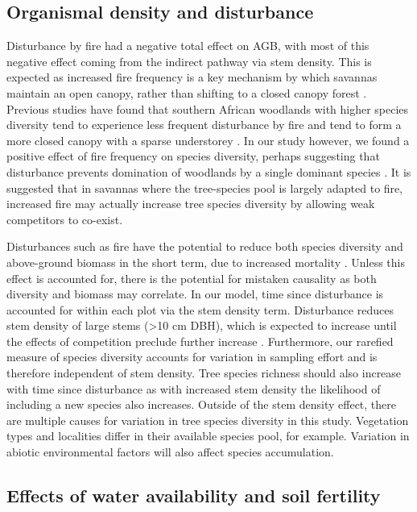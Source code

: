 \begin{refsection}
\subsection{Organismal density and disturbance}
\label{befr:ssec:disturbance}

Disturbance by fire had a negative total effect on AGB, with most of this negative effect coming from the indirect pathway via stem density. This is expected as increased fire frequency is a key mechanism by which savannas maintain an open canopy, rather than shifting to a closed canopy forest \citep{Staver2011}. Previous studies have found that southern African woodlands with higher species diversity tend to experience less frequent disturbance by fire and tend to form a more closed canopy with a sparse understorey \citep{Chidumayo2013, Mutowo2012}. In our study however, we found a positive effect of fire frequency on species diversity, perhaps suggesting that disturbance prevents domination of woodlands by a single dominant species \citep{Chidumayo2013, Durigan2020, Staver2009}. It is suggested that in savannas where the tree-species pool is largely adapted to fire, increased fire may actually increase tree species diversity by allowing weak competitors to co-exist. 

Disturbances such as fire have the potential to reduce both species diversity and above-ground biomass in the short term, due to increased mortality \citep{Huston2014}. Unless this effect is accounted for, there is the potential for mistaken causality as both diversity and biomass may correlate. In our model, time since disturbance is accounted for within each plot via the stem density term. Disturbance reduces stem density of large stems (>10 cm DBH), which is expected to increase until the effects of competition preclude further increase \citep{Johnson2012}. Furthermore, our rarefied measure of species diversity accounts for variation in sampling effort and is therefore independent of stem density. Tree species richness should also increase with time since disturbance as with increased stem density the likelihood of including a new species also increases. Outside of the stem density effect, there are multiple causes for variation in tree species diversity in this study. Vegetation types and localities differ in their available species pool, for example. Variation in abiotic environmental factors will also affect species accumulation. 

\subsection{Effects of water availability and soil fertility}
\label{befr:ssec:water}


\end{refsection}
